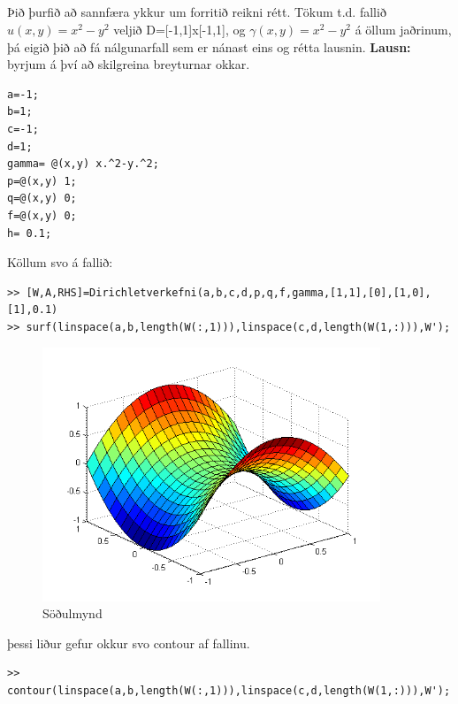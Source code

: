 \documentclass[11pt,a4paper,titlepage]{article}
\begin{document}
\subsection{}
Þið þurfið að sannfæra ykkur um forritið reikni rétt.  Tökum t.d. fallið $u(x,y)=x^2-y^2$ veljið D=[-1,1]x[-1,1], og $\gamma(x,y)=x^2-y^2$ á öllum jaðrinum, þá eigið þið að fá nálgunarfall sem er nánast eins og rétta lausnin.
\textbf{Lausn:}
byrjum á því að skilgreina breyturnar okkar. 
\begin{verbatim}
a=-1;
b=1;
c=-1;
d=1;
gamma= @(x,y) x.^2-y.^2;
p=@(x,y) 1;
q=@(x,y) 0;
f=@(x,y) 0;
h= 0.1;
\end{verbatim}

Köllum svo á fallið:
\begin{verbatim}
>> [W,A,RHS]=Dirichletverkefni(a,b,c,d,p,q,f,gamma,[1,1],[0],[1,0],[1],0.1)
>> surf(linspace(a,b,length(W(:,1))),linspace(c,d,length(W(1,:))),W'); 
\end{verbatim}
 \begin{figure}[h!]
     \centering
     \includegraphics[width=0.9\textwidth]{sodulmynd1.png}
     \caption{Söðulmynd}
     \label{fig:awesome_image5}
 \end{figure}
 \newpage
þessi liður gefur okkur svo contour af fallinu. 
\begin{verbatim}
>> contour(linspace(a,b,length(W(:,1))),linspace(c,d,length(W(1,:))),W');
\end{verbatim}
\end{document}
